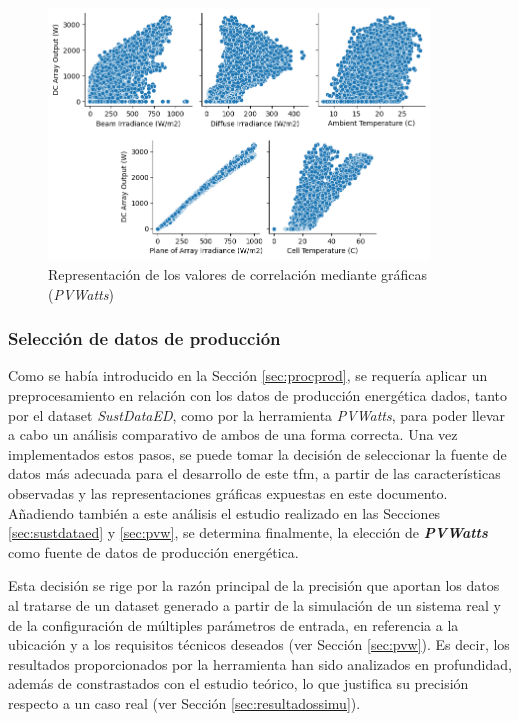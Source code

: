 \begin{figure}[H]
  \centering
  \includegraphics[width=0.9\textwidth]{img/diseno/corrgraficas.png}
  \caption{Representación de los valores de correlación mediante gráficas (\textit{PVWatts})}
  \label{fig:corrgraficas}
\end{figure}

\subsubsection{Selección de datos de producción}
\label{sec:select}

Como se había introducido en la Sección \ref{sec:procprod}, se requería aplicar un preprocesamiento en relación con los datos de producción energética dados, tanto por el dataset \textit{SustDataED}, como por la herramienta \textit{PVWatts}, para poder llevar a cabo un análisis comparativo de ambos de una forma correcta. Una vez implementados estos pasos, se puede tomar la decisión de seleccionar la fuente de datos más adecuada para el desarrollo de este \gls{tfm}, a partir de las características observadas y las representaciones gráficas expuestas en este documento. Añadiendo también a este análisis el estudio realizado en las Secciones \ref{sec:sustdataed} y \ref{sec:pvw}, se determina finalmente, la elección de \textbf{\textit{PVWatts}} como fuente de datos de producción energética. 

\vspace{3mm}

Esta decisión se rige por la razón principal de la precisión que aportan los datos al tratarse de un dataset generado a partir de la simulación de un sistema real y de la configuración de múltiples parámetros de entrada, en referencia a la ubicación y a los requisitos técnicos deseados (ver Sección \ref{sec:pvw}). Es decir, los resultados proporcionados por la herramienta han sido analizados en profundidad, además de constrastados con el estudio teórico, lo que justifica su precisión respecto a un caso real (ver Sección \ref{sec:resultadossimu}).  

